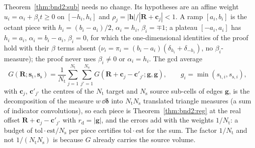 \begin{remark}
\label{rem:xs:sub}
Theorem~\ref{thm:bnd2:sub} needs no change. Its hypotheses are an affine weight
$u_i = \alpha_i+\beta_it\ge0$ on $[-h_i,h_i]$ and $\rho_j = |\mathbf{h}|/|\mathbf{R}+\mathbf{c}_j|<1$.
A ramp $[a_i,b_i]$ is the octant piece with $h_i = (b_i-a_i)/2$, $\alpha_i = h_i$,
$\beta_i = \mp1$; a plateau $[-a_i,a_i]$ has $h_i = a_i$, $\alpha_i = b_i-a_i$, $\beta_i = 0$,
for which the one-dimensional identities of the proof hold with their $\beta$ terms absent
($\nu_i = \pi_i = (b_i-a_i)(\delta_{h_i}+\delta_{-h_i})$, no $\beta_i$-measure); the proof
never uses $\beta_i\ne0$ or $\alpha_i = h_i$. The gcd average
\begin{equation}
G(\mathbf{R};\mathbf{s}_{\mathrm{t}},\mathbf{s}_{\mathrm{s}}) = \frac{1}{N_{\mathrm{t}}}\sum_{j=1}^{N_{\mathrm{t}}}\sum_{j'=1}^{N_{\mathrm{s}}}
G(\mathbf{R}+\mathbf{c}_j-\mathbf{c}'_{j'};\mathbf{g},\mathbf{g}),\qquad g_i = \min(s_{\mathrm{t},i},s_{\mathrm{s},i}),
\label{eq:xs:gcd}
\end{equation}
with $\mathbf{c}_j$, $\mathbf{c}'_{j'}$ the centres of the $N_{\mathrm{t}}$ target and
$N_{\mathrm{s}}$ source sub-cells of edges $\mathbf{g}$, is the decomposition of the measure
$w\,\dd\boldsymbol{\delta}$ into $N_{\mathrm{t}}N_{\mathrm{s}}$ translated triangle
measures (a sum of indicator convolutions), so each piece is Theorem~\ref{thm:bnd2:reg} at
the real offset $\mathbf{R}+\mathbf{c}_j-\mathbf{c}'_{j'}$ with $r_{\mathrm{d}} = |\mathbf{g}|$,
and the errors add with the weights $1/N_{\mathrm{t}}$: a budget of
$\mathrm{tol}\cdot\mathrm{est}/N_{\mathrm{s}}$ per piece certifies $\mathrm{tol}\cdot\mathrm{est}$
for the sum. The factor $1/N_{\mathrm{t}}$ and not $1/(N_{\mathrm{t}}N_{\mathrm{s}})$ is
because $G$ already carries the source volume.
\end{remark}


